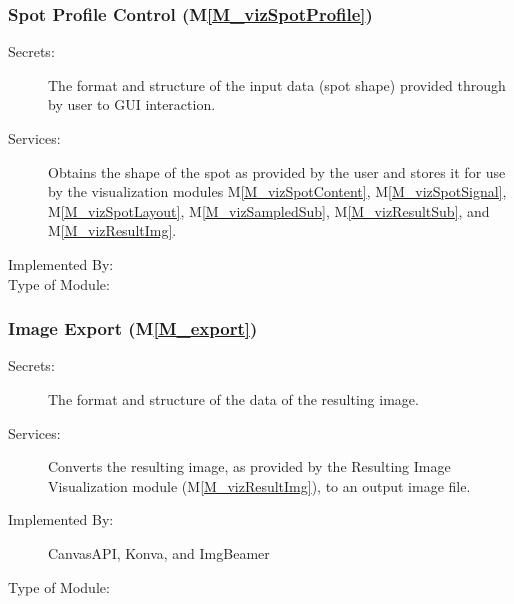 \documentclass[12pt, titlepage]{article}
\newcommand{\mref}[1]{M\ref{#1}}
\begin{document}
\subsubsection{Spot Profile Control (\mref{M_vizSpotProfile})}
\begin{description}
\item[Secrets:]The format and structure of the input data (spot shape) provided
  through by user to GUI interaction.
\item[Services:] Obtains the shape of the spot as provided by the user and stores it for use
  by the visualization modules \mref{M_vizSpotContent}, \mref{M_vizSpotSignal}, \mref{M_vizSpotLayout},
  \mref{M_vizSampledSub}, \mref{M_vizResultSub}, and \mref{M_vizResultImg}.
\item[Implemented By:] \progname{}
\item[Type of Module:] 
\end{description}


\subsubsection{Image Export (\mref{M_export})}
\begin{description}
\item[Secrets:]The format and structure of the data of the resulting image.
\item[Services:]Converts the resulting image, as provided by the 
  Resulting Image Visualization module (\mref{M_vizResultImg}), to an output image file.
\item[Implemented By:] CanvasAPI, Konva, and ImgBeamer
\item[Type of Module:] 
\end{description}
\end{document}
